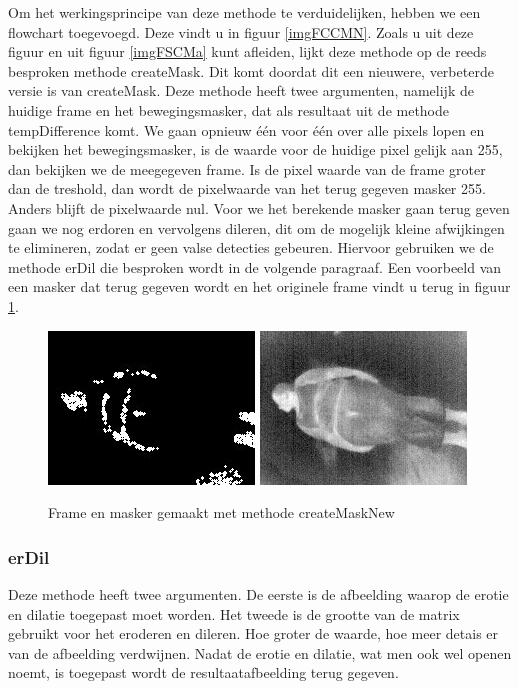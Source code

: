Om het werkingsprincipe van deze methode te verduidelijken, hebben we een flowchart toegevoegd. Deze vindt u in figuur \ref{imgFCCMN}. Zoals u uit deze figuur en uit figuur \ref{imgFSCMa} kunt afleiden, lijkt deze methode op de reeds besproken methode createMask. Dit komt doordat dit een nieuwere, verbeterde versie is van createMask. Deze methode heeft twee argumenten, namelijk de huidige frame en het bewegingsmasker, dat als resultaat uit de methode tempDifference komt. We gaan opnieuw \'e\'en voor \'e\'en over alle pixels lopen en bekijken het bewegingsmasker, is de waarde voor de huidige pixel gelijk aan 255, dan bekijken we de meegegeven frame. Is de pixel waarde van de frame groter dan de treshold, dan wordt de pixelwaarde van het terug gegeven masker 255. Anders blijft de pixelwaarde nul. Voor we het berekende masker gaan terug geven gaan we nog erdoren en vervolgens dileren, dit om de mogelijk kleine afwijkingen te elimineren, zodat er geen valse detecties gebeuren. Hiervoor gebruiken we de methode erDil die besproken wordt in de volgende paragraaf. Een voorbeeld van een masker dat terug gegeven wordt en het originele frame vindt u terug in figuur \ref{imgCMN}.
\begin{figure}[h]
	\includegraphics[scale=0.65]{MaskMetDif}
	\includegraphics[scale=0.65]{ImgMetDif}
	\caption{Frame en masker gemaakt met methode createMaskNew}
	\label{imgCMN}
\end{figure} 
 
 
 \subsubsection{erDil}
 Deze methode heeft twee argumenten. De eerste is de afbeelding waarop de erotie en dilatie toegepast moet worden. Het tweede is de grootte van de matrix gebruikt voor het eroderen en dileren. Hoe groter de waarde, hoe meer detais er van de afbeelding verdwijnen. Nadat de erotie en dilatie, wat men ook wel openen noemt, is  toegepast wordt de resultaatafbeelding terug gegeven. 
 
